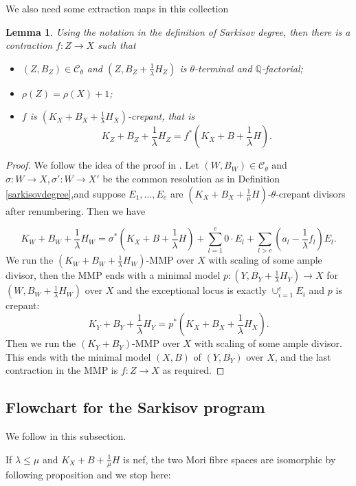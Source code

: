 \documentclass[11pt]{amsart}
\newtheorem{lem}[defn]{Lemma}
\begin{document}
We also need some  extraction maps in this collection 
\begin{lem}\label{thetaextraction}
Using the notation in the definition of Sarkisov degree, then there is a contraction  $f:Z\to X$ such that 
\begin{itemize}
  \item $(Z,B_{Z})\in \mathcal{C}_{\theta}$ and $(Z,B_{Z}+\frac{1}{\lambda}H_{Z})$ is $\theta$-terminal and $\mathbb{Q}$-factorial;
    \item  $\rho(Z)=\rho(X)+1$;
    \item $f$ is $(K_{X}+B_{X}+\frac{1}{\lambda}H_{X})$-crepant, that is 
      \[
        K_{Z}+B_{Z}+\frac{1}{\lambda}H_{Z}=f^*(K_{X}+B+\frac{1}{\lambda}H)
      .\] 
\end{itemize}
\end{lem}
\begin{proof}
  We follow the idea of the proof in \cite[Proposition 1.6]{brunoLogSarkisovProgram1995}.  Let $(W,B_{W})\in \mathcal{C}_{\theta}$ and $\sigma:W\to X,\sigma':W \to X'$ be the common resolution as in Definition \ref{sarkisovdegree},and suppose  $E_{1},\ldots ,E_{e}$ are   $(K_{X}+B_{X}+\frac{1}{\mu}H)$-$\theta$-crepant divisors after renumbering. Then we have

\[ K_W+B_W+\frac{1}{\lambda} H_W=\sigma^*(K_X+B+\frac{1}{\lambda} H)+\sum_{l=1}^{e} 0\cdot E_{l}+\sum_{l>e}(a_l-\frac{1}{\lambda} f_l)E_l .\]
We run the $(K_{W}+B_{W}+\frac{1}{\lambda}H_{W})$-MMP over $X$ with scaling of some ample divisor, then the MMP ends with a minimal model $p:(Y,B_{Y}+\frac{1}{\lambda}H_{Y})\to X$  for $(W,B_{W}+\frac{1}{\lambda}H_{W})$ over $X$ and the exceptional locus is exactly $\cup_{i=1}^{e}E_{i}$ and $p$ is crepant: 
\[
 K_{Y}+B_{Y}+\frac{1}{\lambda}H_{Y}=p^*(K_{X}+B_{X}+\frac{1}{\lambda}H_{X}) 
.\]
Then we run the $(K_{Y}+B_{Y})$-MMP over $X$ with scaling of some ample divisor. This ends with the minimal model  $(X,B)$ of $(Y,B_{Y})$ over $X$, and the last contraction  in the MMP is $f:Z\to X$  as required.
\end{proof}
\subsection{Flowchart for the Sarkisov program}
We follow \cite[Flowchart for the Sarkisov program]{brunoLogSarkisovProgram1995} in this subsection.

If $ \lambda\leqslant\mu $ and $ K_X+B+\frac{1}{\mu}H $ is nef, the two Mori fibre spaces are isomorphic by following proposition and we stop here:
\end{document}
